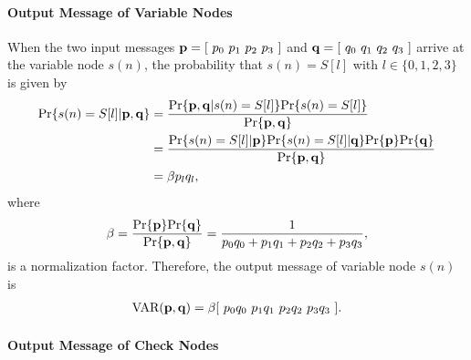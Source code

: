 \paragraph{Output Message of Variable Nodes}

When the two input messages ${\bf p} = [ \ p_0 \ p_1 \ p_2 \ p_3 \ ]$ and ${\bf q} = [ \ q_0 \ q_1 \ q_2 \ q_3 \ ]$ arrive at the variable node $s(n)$, the probability that $s(n)=S[l]$ with $l \in \{0 ,1, 2, 3\}$ is given by
\begin{align}
 \text{Pr}\{s(n)=S[l]|{\bf p}, {\bf q}\} & = \frac{\text{Pr}\{{\bf p}, {\bf q}|s(n)=S[l]\}\text{Pr}\{s(n)=S[l]\}}{\text{Pr}\{{\bf p}, {\bf q}\}} \nonumber \\
 & = \frac{\text{Pr}\{s(n)=S[l]|{\bf p}\}\text{Pr}\{s(n)=S[l]|{\bf q}\}\text{Pr}\{{\bf p}\}\text{Pr}\{{\bf q}\}}{\text{Pr}\{{\bf p}, {\bf q}\}} \nonumber \\
 & = \beta p_l q_l ,
\end{align}
where
\begin{align}
 \beta = \frac{\text{Pr}\{{\bf p}\}\text{Pr}\{{\bf q}\}}{\text{Pr}\{{\bf p}, {\bf q}\}} = \frac{1}{p_0 q_0 + p_1 q_1 + p_2 q_2 + p_3 q_3} ,
\end{align}
is a normalization factor. Therefore, the output message of variable node $s(n)$ is
\begin{align}
 \text{VAR}({\bf p}, {\bf q}) = \beta [ \ p_0 q_0 \ p_1 q_1 \ p_2 q_2 \ p_3 q_3 \ ] .
\end{align}

\paragraph{Output Message of Check Nodes}

